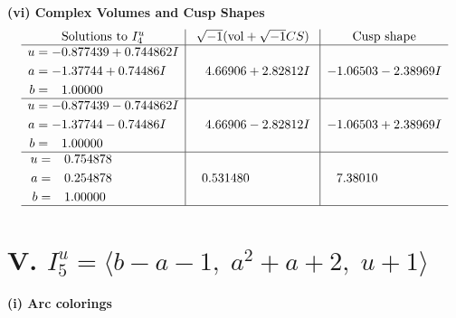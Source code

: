 \documentclass[1p]{elsarticle_modified}
\theoremstyle{definition}
\newcommand{\I}{\sqrt{-1}}
\begin{document}
\newpage\flushleft \textbf{(vi) Complex Volumes and Cusp Shapes}
$$\begin{array}{c|c|c}  
\text{Solutions to }I^u_{4}& \I (\text{vol} + \sqrt{-1}CS) & \text{Cusp shape}\\
 \hline 
\begin{aligned}
u &= -0.877439 + 0.744862 I \\
a &= -1.37744 + 0.74486 I \\
b &= \phantom{-}1.00000\phantom{ +0.000000I}\end{aligned}
 & \phantom{-}4.66906 + 2.82812 I & -1.06503 - 2.38969 I \\ \hline\begin{aligned}
u &= -0.877439 - 0.744862 I \\
a &= -1.37744 - 0.74486 I \\
b &= \phantom{-}1.00000\phantom{ +0.000000I}\end{aligned}
 & \phantom{-}4.66906 - 2.82812 I & -1.06503 + 2.38969 I \\ \hline\begin{aligned}
u &= \phantom{-}0.754878\phantom{ +0.000000I} \\
a &= \phantom{-}0.254878\phantom{ +0.000000I} \\
b &= \phantom{-}1.00000\phantom{ +0.000000I}\end{aligned}
 & \phantom{-}0.531480\phantom{ +0.000000I} & \phantom{-}7.38010\phantom{ +0.000000I}\\
 \hline 
 \end{array}$$\newpage\newpage\renewcommand{\arraystretch}{1}
\centering \section*{V. $I^u_{5}= \langle b- a-1,\;a^2+a+2,\;u+1 \rangle$}
\flushleft \textbf{(i) Arc colorings}\\
\end{document}
